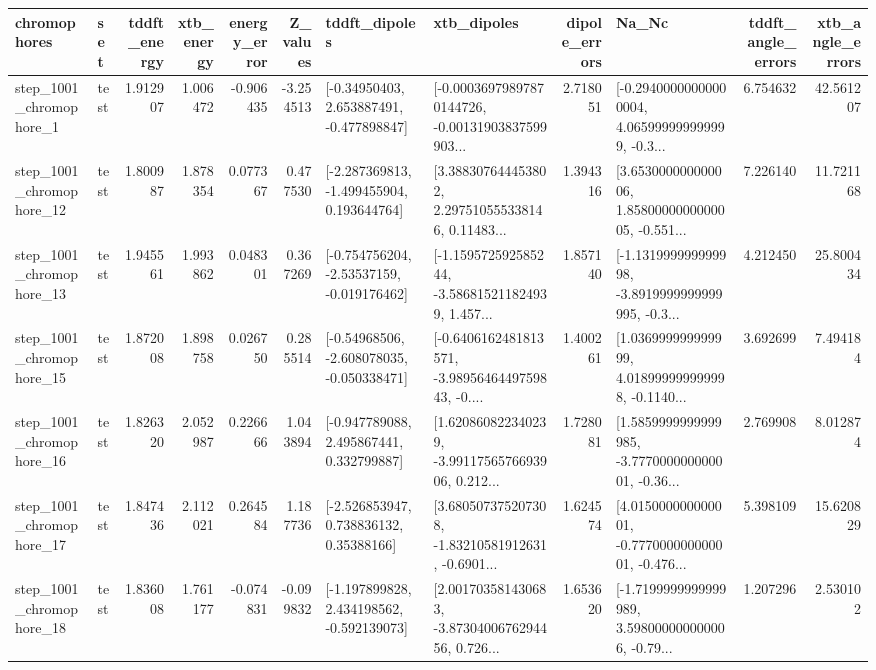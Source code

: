 \begin{tabular}{llrrrrllrlrr}
\toprule
             chromophores &       set &  tddft\_energy &  xtb\_energy &  energy\_error &  Z\_values &                               tddft\_dipoles &                                        xtb\_dipoles &  dipole\_errors &                                              Na\_Nc &  tddft\_angle\_errors &  xtb\_angle\_errors \\
\midrule
  step\_1001\_chromophore\_1 &      test &      1.912907 &    1.006472 &     -0.906435 & -3.254513 &    [-0.34950403, 2.653887491, -0.477898847] &  [-0.00036979897870144726, -0.00131903837599903... &       2.718051 &  [-0.29400000000000004, 4.065999999999999, -0.3... &            6.754632 &         42.561207 \\
 step\_1001\_chromophore\_12 &      test &      1.800987 &    1.878354 &      0.077367 &  0.477530 &   [-2.287369813, -1.499455904, 0.193644764] &  [3.388307644453802, 2.297510555338146, 0.11483... &       1.394316 &  [3.653000000000006, 1.8580000000000005, -0.551... &            7.226140 &         11.721168 \\
 step\_1001\_chromophore\_13 &      test &      1.945561 &    1.993862 &      0.048301 &  0.367269 &   [-0.754756204, -2.53537159, -0.019176462] &  [-1.159572592585244, -3.586815211824939, 1.457... &       1.857140 &  [-1.131999999999998, -3.8919999999999995, -0.3... &            4.212450 &         25.800434 \\
 step\_1001\_chromophore\_15 &      test &      1.872008 &    1.898758 &      0.026750 &  0.285514 &   [-0.54968506, -2.608078035, -0.050338471] &  [-0.6406162481813571, -3.9895646449759843, -0.... &       1.400261 &  [1.036999999999999, 4.018999999999998, -0.1140... &            3.692699 &          7.494184 \\
 step\_1001\_chromophore\_16 &      test &      1.826320 &    2.052987 &      0.226666 &  1.043894 &    [-0.947789088, 2.495867441, 0.332799887] &  [1.620860822340239, -3.9911756576693906, 0.212... &       1.728081 &  [1.5859999999999985, -3.777000000000001, -0.36... &            2.769908 &          8.012874 \\
 step\_1001\_chromophore\_17 &      test &      1.847436 &    2.112021 &      0.264584 &  1.187736 &     [-2.526853947, 0.738836132, 0.35388166] &  [3.680507375207308, -1.83210581912631, -0.6901... &       1.624574 &  [4.015000000000001, -0.777000000000001, -0.476... &            5.398109 &         15.620829 \\
 step\_1001\_chromophore\_18 &      test &      1.836008 &    1.761177 &     -0.074831 & -0.099832 &   [-1.197899828, 2.434198562, -0.592139073] &  [2.001703581430683, -3.8730400676294456, 0.726... &       1.653620 &  [-1.7199999999999989, 3.598000000000006, -0.79... &            1.207296 &          2.530102 \\

\end{tabular}
